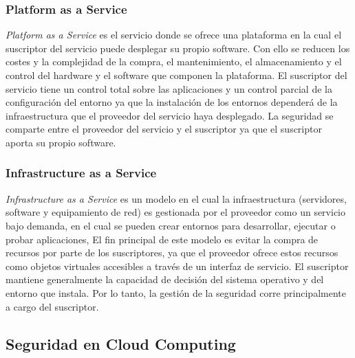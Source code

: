 \subsubsection{Platform as a Service}

\emph{Platform as a Service} es el servicio donde se ofrece una plataforma en la cual el suscriptor del servicio puede desplegar su propio software. Con ello se reducen los costes y la complejidad de la compra, el mantenimiento, el almacenamiento y el control del hardware y el software que componen la plataforma. El suscriptor del servicio tiene un control total sobre las aplicaciones y un control parcial de la configuración del entorno ya que la instalación de los entornos dependerá de la infraestructura que el proveedor del servicio haya desplegado. La seguridad se comparte entre el proveedor del servicio y el suscriptor ya que el suscriptor aporta su propio software.

\subsubsection{Infrastructure as a Service}

\emph{Infrastructure as a Service} es un modelo en el cual la infraestructura (servidores, software y equipamiento de red) es gestionada por el proveedor como un servicio bajo demanda, en el cual se pueden crear entornos para desarrollar, ejecutar o probar aplicaciones, El fin principal de este modelo es evitar la compra de recursos por parte de los suscriptores, ya que el proveedor ofrece estos recursos como objetos virtuales accesibles a través de un interfaz de servicio. El suscriptor mantiene generalmente la capacidad de decisión del sistema operativo y del entorno que instala. Por lo tanto, la gestión de la seguridad corre principalmente a cargo del suscriptor.

\subsection{Seguridad en Cloud Computing}

